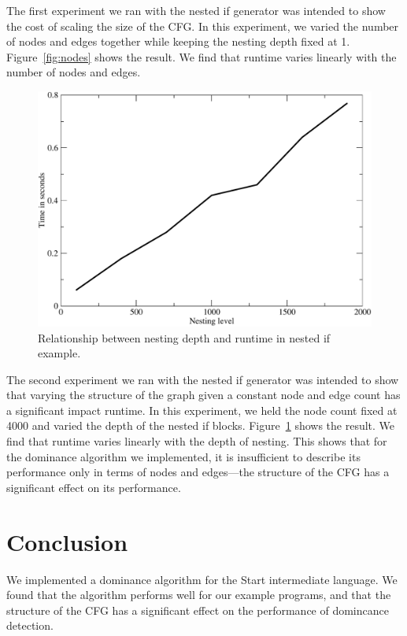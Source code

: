 \documentclass[10pt,twocolumn]{article}
\begin{document}
The first experiment we ran with the nested if generator was intended
to show the cost of scaling the size of the CFG. In this experiment,
we varied the number of nodes and edges together while keeping the
nesting depth fixed at 1. Figure~\ref{fig:nodes} shows the result. We
find that runtime varies linearly with the number of nodes and edges.


\begin{figure}
\begin{center}
  \includegraphics[width=0.95\columnwidth]{figs/nesting.pdf}
\begin{minipage}{0.95\columnwidth}
  \caption{\label{fig:nesting} Relationship between nesting depth and runtime in nested if example.}
\end{minipage}
\end{center}
\end{figure}

The second experiment we ran with the nested if generator was intended
to show that varying the structure of the graph given a constant node
and edge count has a significant impact runtime. In this experiment,
we held the node count fixed at 4000 and varied the depth of the
nested if blocks. Figure~\ref{fig:nesting} shows the result. We find
that runtime varies linearly with the depth of nesting. This shows
that for the dominance algorithm we implemented, it is insufficient to
describe its performance only in terms of nodes and edges---the
structure of the CFG has a significant effect on its performance.

\section{Conclusion}

We implemented a dominance algorithm for the Start intermediate
language. We found that the algorithm performs well for our example
programs, and that the structure of the CFG has a significant effect
on the performance of domincance detection.



\end{document}
